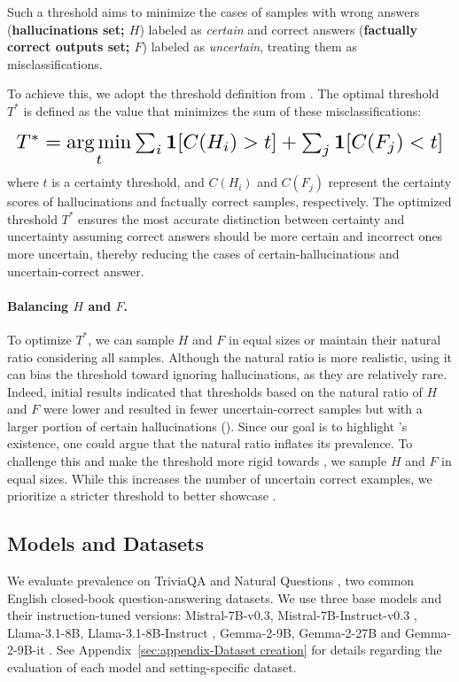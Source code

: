 Such a threshold aims to minimize the cases of samples with wrong answers (\textbf{hallucinations set;  \(H\)}) labeled as \textit{certain} and correct answers (\textbf{factually correct outputs set; \(F\)}) labeled as \textit{uncertain}, treating them as misclassifications.

To achieve this, we adopt the threshold definition from \citet{feng2024don}. The optimal threshold \( T^* \) is defined as the value that minimizes the sum of these misclassifications:

\begin{align}
 \resizebox{\linewidth}{!}{$
T^*=\underset{t}{\arg\min} \sum_{i} \mathbf{1}[C(H_i) > t] + \sum_{j} \mathbf{1}[C(F_j) < t]
$}
\end{align}
%
where \( t \) is a certainty threshold, and \( C(H_i) \) and \( C(F_j) \) represent the certainty scores of hallucinations and factually correct samples, respectively. %
The optimized threshold \( T^* \) ensures the most accurate distinction between certainty and uncertainty assuming correct answers should be more certain and incorrect ones more uncertain, thereby reducing the cases of certain-hallucinations and uncertain-correct answer.

\paragraph{Balancing \( H \) and \( F \).}
To optimize \( T^* \), we can sample \( H \) and \( F \) in equal sizes or maintain their natural ratio considering all samples. Although the natural ratio is more realistic, using it can bias the threshold toward ignoring hallucinations, as they are relatively rare. 
Indeed, initial results indicated that thresholds based on the natural ratio of \( H \) and \( F \) were lower and resulted in fewer uncertain-correct samples but with a larger portion of certain hallucinations (\chk).
Since our goal is to highlight \chk's existence, one could argue that the natural ratio inflates its prevalence. To challenge this and make the threshold more rigid towards \chk, we sample \( H \) and \( F \) in equal sizes.
While this increases the number of uncertain correct examples, we prioritize a stricter threshold to better showcase \chk.


\subsection{Models and Datasets}\label{sec:Implementation Details}


We evaluate \chk prevalence on \mbox{TriviaQA} \citep{triviaqa} and Natural Questions \citep{kwiatkowski2019natural}, two common English closed-book question-answering datasets. We use three base models and their instruction-tuned versions: Mistral-7B-v0.3, Mistral-7B-Instruct-v0.3 \citep{mistral_7b_paper}, Llama-3.1-8B,  Llama-3.1-8B-Instruct \citep{llama3}, Gemma-2-9B, Gemma-2-27B and Gemma-2-9B-it \citep{team2024gemma}. 
See Appendix~\ref{sec:appendix-Dataset creation} for details regarding the evaluation of each model and setting-specific dataset.
